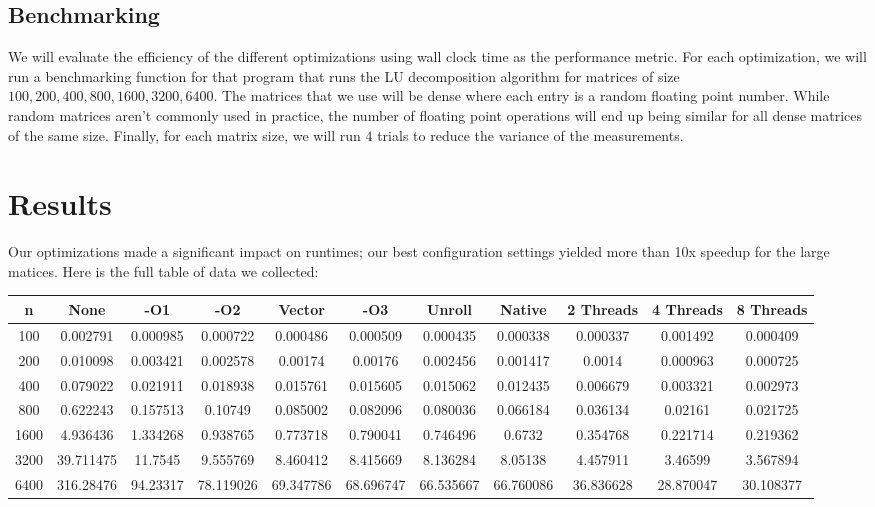 \documentclass[12]{article}
\begin{document}
\subsection{Benchmarking}

We will evaluate the efficiency of the different optimizations using wall clock time as the performance metric.  For each optimization, we will run a benchmarking function for that program that runs the LU decomposition algorithm for matrices of size $100,200,400,800,1600,3200,6400$.  The matrices that we use will be dense where each entry is a random floating point number.  While random matrices aren't commonly used in practice, the number of floating point operations will end up being similar for all dense matrices of the same size.  Finally, for each matrix size, we will run $4$ trials to reduce the variance of the measurements.

\section{Results}

Our optimizations made a significant impact on runtimes; our best configuration settings  yielded more than 10x speedup for the large matices.  Here is the full table of data we collected:

\hskip-2.2cm
\begin{tabular}{|c|c|c|c|c|c|c|c|c|c|c|}
\hline
n & None & -O1 & -O2 & Vector & -O3 & Unroll & Native & 2 Threads & 4 Threads & 8 Threads\\
\hline
100	& 0.002791 & 0.000985 & 0.000722 & 0.000486 & 0.000509 & 0.000435 & 0.000338 & 	0.000337 & 0.001492	& 0.000409 \\
200	& 0.010098 & 0.003421 &	0.002578 &	0.00174 & 0.00176 & 0.002456 & 0.001417 & 	0.0014 & 0.000963 &	0.000725 \\
400	& 0.079022 & 0.021911 & 0.018938 & 0.015761 & 0.015605 & 0.015062 & 0.012435 & 0.006679 & 0.003321 & 0.002973 \\
800	& 0.622243 & 0.157513 & 0.10749 & 0.085002 & 0.082096 & 0.080036 & 0.066184 & 0.036134 & 0.02161 & 0.021725 \\
1600 & 4.936436 & 1.334268 & 0.938765 & 0.773718 & 0.790041 & 0.746496 & 0.6732 &	0.354768 & 0.221714 & 0.219362 \\
3200&39.711475&11.7545&9.555769&8.460412&	8.415669&8.136284&8.05138&4.457911&3.46599&	3.567894 \\

6400&316.28476&94.23317&78.119026&	69.347786&68.696747&66.535667&66.760086&	36.836628&28.870047&30.108377 \\
\hline
\end{tabular}
\end{document}
